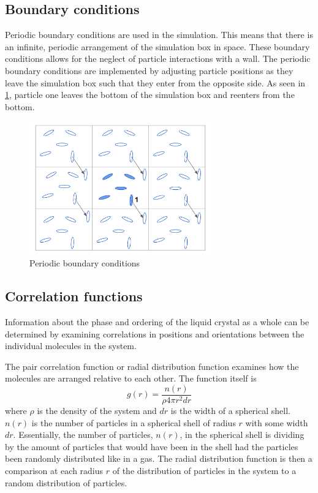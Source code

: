\documentclass[preprint, aps]{revtex4-1}
\begin{document}
\subsection*{Boundary conditions}
Periodic boundary conditions are used in the simulation. This means that there 
is an infinite, periodic arrangement of the simulation box in space. These 
boundary conditions allows for the neglect of particle interactions with a wall.
The periodic boundary conditions are implemented by adjusting particle positions
as they	leave the simulation box such that they enter from the opposite side. As
seen in \ref{fig:periodic}, particle one leaves the bottom of the simulation box and reenters from the bottom.
	\begin{figure}
		\centering
		\includegraphics[width=0.7\textwidth]{periodic.png}
		\caption{Periodic boundary conditions}
		\label{fig:periodic}
	\end{figure}

\subsection*{Correlation functions}
Information about the phase and ordering of the liquid crystal as a whole can be
determined by examining correlations in positions and orientations between the
individual molecules in the system.

The pair correlation function or radial distribution function examines how the
molecules are arranged relative to each other. The function itself is
	\begin{equation}
	        g(r)=\frac{n(r)}{\rho 4 \pi r^2 dr}
	\end{equation}
where $\rho$ is the density of the system and $dr$ is the width of a spherical
shell. $n(r)$ is the number of particles in a spherical shell of radius $r$ with
some width $dr$. Essentially, the number of particles, $n(r)$, in the spherical
shell is dividing by the amount of particles that would have been in the shell
had the particles been randomly distributed like in a gas. The radial
distribution function is then a comparison at each radius $r$ of the
distribution of particles in the system to a random distribution of particles. 
\end{document}
